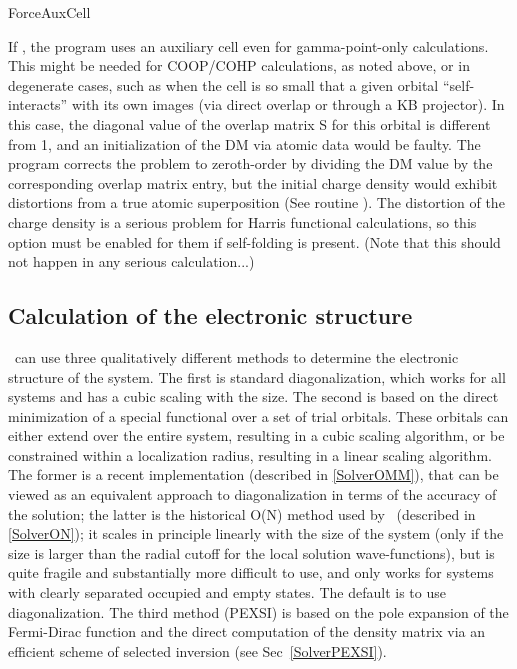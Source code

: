 \begin{fdflogicalF}{ForceAuxCell}

If \fdftrue, the program uses an auxiliary cell even for gamma-point-only
calculations. This might be needed for COOP/COHP calculations, as
noted above,  or in degenerate cases, such as when the cell is so
small that a given orbital ``self-interacts'' with its own images (via
direct overlap or through a KB projector). In this case, the diagonal
value of the overlap matrix S for this orbital is different from 1, and an
initialization of the DM via atomic data would be faulty. The
program corrects the problem to zeroth-order by dividing the DM value
by the corresponding overlap matrix entry, but the initial charge
density would exhibit distortions from a true atomic superposition
(See routine ). The distortion of the charge density
is a serious problem for Harris functional calculations, so this
option must be enabled for them if self-folding is present. (Note that
this should not happen in any serious calculation...)

\end{fdflogicalF}



\subsection{Calculation of the electronic structure}

\siesta\ can use three qualitatively different methods to determine
the electronic structure of the system. The first is standard
diagonalization, which works for all systems and has a cubic scaling
with the size. The second is based on
the direct minimization of a special functional over a set of
trial orbitals. These orbitals can either extend over the entire system,
resulting in a cubic scaling algorithm, or be constrained within a
localization radius, resulting in a linear scaling algorithm. The former
is a recent implementation (described in \ref{SolverOMM}), that can
be viewed as an equivalent approach to diagonalization in terms of the
accuracy of the solution; the latter is the historical O(N) method used by
\siesta\ (described in \ref{SolverON}); it scales in principle
linearly with the size of the system (only if the size is larger than
the radial cutoff for the local solution wave-functions), but is quite
fragile and substantially more difficult to use, and only works for
systems with clearly separated occupied and empty states. The default is
to use diagonalization. The third method (PEXSI) is based on the
pole expansion of the Fermi-Dirac function and the direct computation
of the density matrix via an efficient scheme of selected
inversion (see Sec~\ref{SolverPEXSI}).


